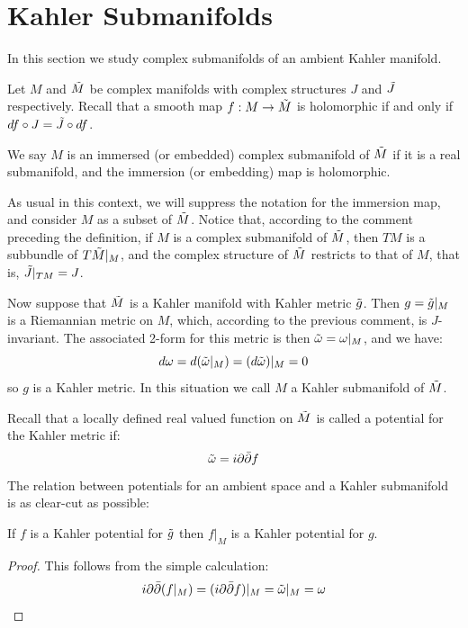 \section{Kahler Submanifolds}

In this section we study complex submanifolds of an ambient Kahler manifold.

Let $M$ and $\tilde{M}$ be complex manifolds with complex structures $J$ and $\tilde{J}$ respectively.  Recall that a smooth map $f:M \rightarrow \tilde{M}$ is holomorphic if and only if $df \circ J = \tilde{J} \circ df$.

\begin{definition} We say $M$ is an immersed (or embedded) complex submanifold of $\tilde{M}$ if it is a real submanifold, and the immersion (or embedding) map is holomorphic.
\end{definition}

As usual in this context, we will suppress the notation for the immersion map, and consider $M$ as a subset of $\tilde{M}$.  Notice that, according to the comment preceding the definition, if $M$ is a complex submanifold of $\tilde{M}$, then $TM$ is a subbundle of $T \tilde{M}|_{M}$, and the complex structure of $\tilde{M}$ restricts to that of $M$, that is, $\tilde{J} |_{TM} = J$.

Now suppose that $\tilde{M}$ is a Kahler manifold with Kahler metric $\tilde{g}$.  Then $g = \tilde{g} |_{M}$ is a Riemannian metric on $M$, which, according to the previous comment, is $J$-invariant.  The associated 2-form for this metric is then $ \tilde{\omega} = \omega |_{M} $, and we have:
%
$$ d \omega = d ( \tilde{\omega} |_{M} ) = ( d \tilde{\omega} )|_{M} = 0 $$
%
so $g$ is a Kahler metric.  In this situation we call $M$ a Kahler submanifold of $\tilde{M}$.

Recall that a locally defined real valued function on $\tilde{M}$ is called a potential for the Kahler metric if:
%
$$ \tilde{\omega} = i \partial \bar{\partial} f $$
%
The relation between potentials for an ambient space and a Kahler submanifold is as clear-cut as possible:

\begin{prop} If $f$ is a Kahler potential for $\tilde{g}$ then $f|_{M}$ is a Kahler potential for $g$.
\end{prop}

\begin{proof} This follows from the simple calculation:
%
$$ i \partial \bar{\partial} ( f|_{M} ) = ( i \partial \bar{\partial} f )|_{M} = \tilde{\omega} |_{M} = \omega $$
%
\end{proof}

